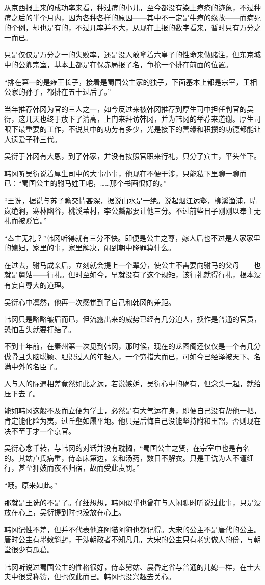 从京西报上来的成功率来看，种过痘的小儿，至今都没有染上痘疮的迹象，不过种痘之后的半个月内，因为各种各样的原因——其中不一定是牛痘的缘故——而病死的个例，却也是有的，不过几率并不大，从现在上报的数字看来，暂时只有万分之一而已。

只是仅仅是万分之一的失败率，还是没人敢拿着六皇子的性命来做赌注，但东京城中的公卿宗室，基本上都是在保赤局报了名，争抢一个排在前面的位置。

“排在第一的是雍王长子，接着是蜀国公主家的独子，下面基本上都是宗室，王相公家的孙子，都排在五十过后了。”

当年推荐韩冈为官的三人之一，如今反过来被韩冈推荐到厚生司中担任判官的吴衍，这几天也终于放下了清高，上门来拜访韩冈，并为韩冈的举荐来道谢。厚生司眼下最重要的工作，不说其中的功劳有多少，光是接下的善缘和积攒的功德都能让人遗爱子孙三代。

吴衍于韩冈有大恩，到了韩家，并没有按照官职来行礼，只分了宾主，平头坐下。

韩冈听吴衍说着厚生司中的大事小事，他现在不便干涉，只能私下里聊一聊而已：“蜀国公主的驸马姓王吧，……那个书画很好的。”

“王诜，据说与苏子瞻交情甚深，据说山水是一绝。说起烟江远壑，柳溪渔浦，晴岚绝涧，寒林幽谷，桃溪苇村，李公麟都要让他三分。不过前些日子刚刚以奉主无礼而被贬官。”

“奉主无礼？”韩冈听得就有三分不快。即便是公主之尊，嫁人后也不过是人家家里的媳妇，家里的事，家里解决，闹到朝中降罪算什么。

在过去，驸马成亲后，立刻就会提上一个辈分，使公主不需要向驸马的父母——也就是舅姑——行礼。但时至如今，早就没有了这个规矩，该行礼就得行礼，根本没有妄自尊大的道理。

吴衍心中凛然，他再一次感觉到了自己和韩冈的差距。

韩冈只是略略皱眉而已，但流露出来的威势已经有几分迫人，换作是普通的官员，恐怕舌头就要打结了。

不到十年前，在秦州第一次见到韩冈，那时候，现在的龙图阁还仅仅是一个有几分傲骨且头脑聪颖、胆识过人的年轻人，一个穷措大而已，可如今已经泽被天下、名满中外的名臣了。

人与人的际遇相差竟然如此之远，若说嫉妒，吴衍心中的确有，但念头一起，就给压下去了。

能如韩冈这般不及而立便为学士，必然是有大气运在身，即便自己没有帮他一把，肯定能化险为夷，过丘壑如履平地。他只是后悔自己没能坚持附和王韶，否则现在决不至于才一个京官。

吴衍心念千转，与韩冈的对话并没有耽搁，“蜀国公主之贤，在宗室中也是有名的。其姑卢氏病重，侍奉床第边，亲和汤药，数日不解衣。只是王诜为人不谨细行，甚至狎妓而夜不归宿，故而受此责罚。”

“哦。原来如此。”

那就是王诜的不是了。仔细想想，韩冈似乎也曾在与人闲聊时听说过此事，只是没放在心上，吴衍提到时也没放在心上。

韩冈记性不差，但并不代表他连阿猫阿狗也都记得。大宋的公主不是唐代的公主。唐时公主有墨敇斜封，干涉朝政者不知凡几，大宋的公主只有老实做人的份，与朝堂很少有瓜葛。

韩冈听说过蜀国公主的性格很好，侍奉舅姑、晨昏定省与普通的儿媳一样，在士大夫中很受称赞，但也仅此而已。韩冈也没兴趣去关心。

